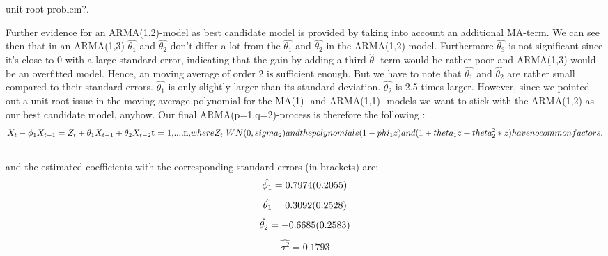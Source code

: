 \documentclass[11pt,a4paper]{article}
\begin{document}
unit root problem?.

Further evidence for an ARMA(1,2)-model as best candidate model is provided by taking into account an additional MA-term. We can see then that in an ARMA(1,3) $\hat{\theta_1}$ and $\hat{\theta_2}$ don't differ a lot from the $\hat{\theta_1}$ and $\hat{\theta_2}$ in the ARMA(1,2)-model. Furthermore $\hat{\theta_3}$ is not significant since it's close to 0 with a large standard error, indicating that the gain by adding a third $\hat{\theta}$- term would be rather poor and ARMA(1,3) would be an overfitted model. Hence, an moving average of order 2 is sufficient enough. But we have to note that $\hat{\theta_1}$ and $\hat{\theta_2}$ are rather small compared to their standard errors. $\hat{\theta_1}$ is only slightly larger than its standard deviation. $\hat{\theta_2}$ is 2.5 times larger. However, since we pointed out a unit root issue in the moving average polynomial for the MA(1)- and ARMA(1,1)- models we want to stick with the ARMA(1,2) as our best candidate model, anyhow. Our final ARMA(p=1,q=2)-process is therefore the following \cite[p.~83]{bd02}:
\begin{equation}
X_t-\phi_1X_{t-1} = Z_t+\theta_1X_{t-1}+\theta_2X_{t-2} \text{t = 1,...,n,} 
\\where {Z_t} ~ WN(0,sigma_2) 
\\and the polynomials (1-phi_1z) and (1+theta_1z+theta_2^2*z) have no common factors.
\end{equation}
\\
and the estimated coefficients with the corresponding standard errors (in brackets) are:
\begin{equation*}
\hat{\phi_1} = 0.7974 \text (0.2055)
\end{equation*}
\begin{equation*}
\hat{\theta_1} = 0.3092 \text (0.2528)
\end{equation*}
\begin{equation*}
\hat{\theta_2} = -0.6685 \text (0.2583)
\end{equation*}
\begin{equation*}
\hat{\sigma^2} = 0.1793
\end{equation*}
\end{document}
